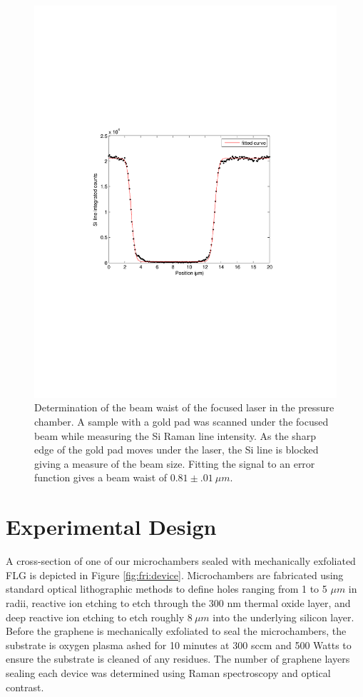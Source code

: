 \begin{figure}
	\begin{center}
	\includegraphics[scale=1]{Figs_Friction/SpotSize.pdf}
	\end{center}
	\caption[Determination of the beam waist of the focused laser in the pressure chamber]{\label{fig:fri:waist}Determination of the beam waist of the focused laser in the pressure chamber. A sample with a gold pad was scanned under the focused beam while measuring the Si Raman line intensity. As the sharp edge of the gold pad moves under the laser, the Si line is blocked giving a measure of the beam size. Fitting the signal to an error function gives a beam waist of $0.81 \pm .01 \ \mu m$.}
\end{figure}

\section{Experimental Design}
A cross-section of one of our microchambers sealed with mechanically exfoliated FLG is depicted in Figure \ref{fig:fri:device}.
Microchambers are fabricated using standard optical lithographic methods to define holes ranging from 1 to 5 $\mu m$ in radii,  reactive ion etching to etch through the 300 nm thermal oxide layer, and deep reactive ion etching to etch roughly $8 \ \mu m$ into the underlying silicon layer.
Before the graphene is mechanically exfoliated to seal the microchambers, the substrate is oxygen plasma ashed for 10 minutes at 300 sccm and 500 Watts to ensure the substrate is cleaned of any residues.
The number of graphene layers sealing each device was determined using Raman spectroscopy\cite{Ferrari2006} and optical contrast\cite{Blake2007,Casiraghi2007a}.


